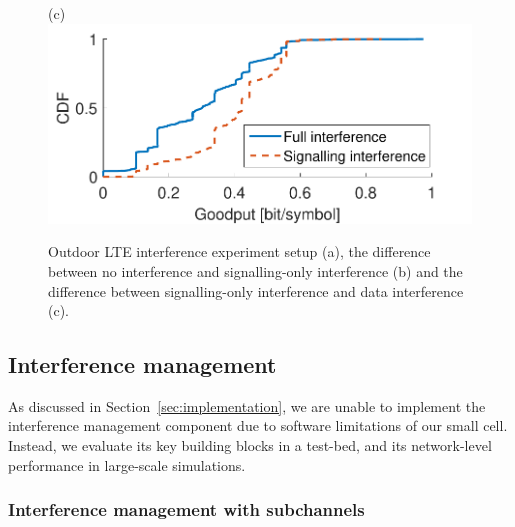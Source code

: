 \begin{figure}[htb!]
\begin{minipage}{0.4\textwidth}
  \end{minipage}
  \begin{minipage}{0.4\textwidth}
    \centering
    (c)
    \includegraphics[width=\textwidth]{./figs/sig_vs_int.pdf}
  \end{minipage}
  \hfill
  \caption{Outdoor LTE interference experiment setup (a), 
  the difference between no interference and signalling-only interference (b) 
  and the difference between signalling-only interference and data interference (c).}
  \label{fig:interf_control}
\vskip -6pt
\end{figure}



\subsection{Interference management}
\label{sec:interfeval}

As discussed in Section~\ref{sec:implementation}, we are unable to implement the interference management component due to software limitations of our small cell. Instead, we evaluate its key building blocks in a test-bed, and its network-level performance in large-scale simulations.





\subsubsection{Interference management with subchannels}

